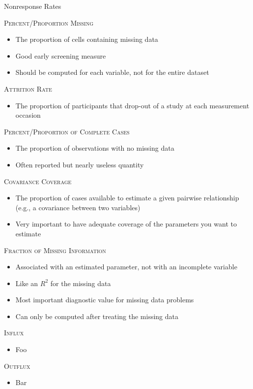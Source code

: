 \documentclass{beamer}\usepackage[]{graphicx}\usepackage[]{color}
\begin{document}
\begin{frame}[allowframebreaks]{Nonresponse Rates}
  
  \textsc{Percent/Proportion Missing}
  \begin{itemize}
  \item The proportion of cells containing missing data
  \item Good early screening measure
  \item Should be computed for each variable, not for the entire dataset
  \end{itemize}
  
  \va
  
  \textsc{Attrition Rate}
  \begin{itemize}
  \item The proportion of participants that drop-out of a study at each 
    measurement occasion
  \end{itemize}
  
  \va
  
  \textsc{Percent/Proportion of Complete Cases}
  \begin{itemize}
  \item The proportion of observations with no missing data
  \item Often reported but nearly useless quantity
  \end{itemize}
  
  \pagebreak
  
  \textsc{Covariance Coverage}
  \begin{itemize}
  \item The proportion of cases available to estimate a given pairwise
    relationship (e.g., a covariance between two variables)
  \item Very important to have adequate coverage of the parameters you
    want to estimate
  \end{itemize}
  
  \va
  
  \textsc{Fraction of Missing Information}
  \begin{itemize}
  \item Associated with an estimated parameter, not with an incomplete variable
  \item Like an $R^2$ for the missing data
  \item Most important diagnostic value for missing data problems
  \item Can only be computed after treating the missing data
  \end{itemize}
  
  \pagebreak
  
  \textsc{Influx}
  \begin{itemize}
  \item Foo
  \end{itemize}
  
  \va
  
  \textsc{Outflux}
  \begin{itemize}
  \item Bar
  \end{itemize}
  
\end{frame}
\end{document}
